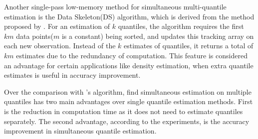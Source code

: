 Another single-pass low-memory method for simultaneous multi-quantile estimation is the Data Skeleton(DS)\cite{mcdermottDataSkeletonsSimultaneous2007} algorithm, which is derived from the method proposed by \citeauthor{liechtySinglepassLowstorageArbitrary} \cite{liechtySinglepassLowstorageArbitrary}. For an estimation of $k$ quantiles, the algorithm requires the first $km$ data points($m$ is a constant) being sorted, and updates this tracking array on each new observation. Instead of the $k$ estimates of quantiles, it returns a total of $km$ estimates due to the redundancy of computation. This feature is considered an advantage for certain applications like density estimation, when extra quantile estimates is useful in accuracy improvement.


Over the comparison with \citeauthor{liechtySinglepassLowstorageArbitrary}'s algorithm, \citeauthor{mcdermottDataSkeletonsSimultaneous2007}\cite{mcdermottDataSkeletonsSimultaneous2007} find simultaneous estimation on multiple quantiles has two main advantages over single quantile estimation methods. First is the reduction in computation time as it does not need to estimate quantiles separately. The second advantage, according to the experiments, is the accuracy improvement in simultaneous quantile estimation.  


